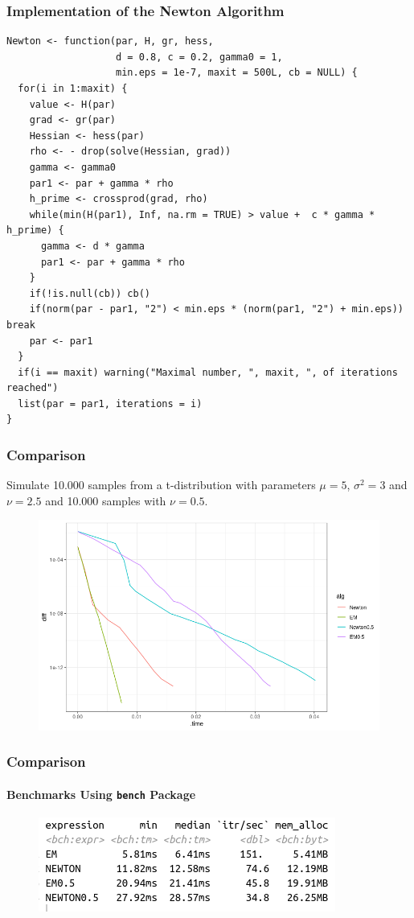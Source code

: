 \documentclass[aspectratio=169]{beamer}
\begin{document}
\begin{frame}[fragile]
    \frametitle{Implementation of the Newton Algorithm}
\begin{verbatim}
Newton <- function(par, H, gr, hess,
                   d = 0.8, c = 0.2, gamma0 = 1, 
                   min.eps = 1e-7, maxit = 500L, cb = NULL) {
  for(i in 1:maxit) {
    value <- H(par)
    grad <- gr(par)
    Hessian <- hess(par) 
    rho <- - drop(solve(Hessian, grad)) 
    gamma <- gamma0
    par1 <- par + gamma * rho
    h_prime <- crossprod(grad, rho)
    while(min(H(par1), Inf, na.rm = TRUE) > value +  c * gamma * h_prime) { 
      gamma <- d * gamma 
      par1 <- par + gamma * rho
    }
    if(!is.null(cb)) cb()
    if(norm(par - par1, "2") < min.eps * (norm(par1, "2") + min.eps)) break 
    par <- par1 
  }
  if(i == maxit) warning("Maximal number, ", maxit, ", of iterations reached")
  list(par = par1, iterations = i)
}
\end{verbatim}
\end{frame}
\begin{frame}
    \frametitle{Comparison}
    Simulate 10.000 samples from a t-distribution with parameters $\mu = 5$, $\sigma^{2}=3$ and $\nu = 2.5$ and 10.000 samples with $\nu = 0.5$.   
    \begin{figure}
        \centering
        \includegraphics[scale = 0.4]{figure/R_NewtonVsEm.png}
    \end{figure}
\end{frame}
\begin{frame}
    \frametitle{Comparison}    
    \framesubtitle{Benchmarks Using \texttt{bench} Package}
    \begin{figure}
        \centering
        \includegraphics[scale = 0.6]{figure/R_NewtonVsEm_table.png}
    \end{figure}
\end{frame}
\end{document}
